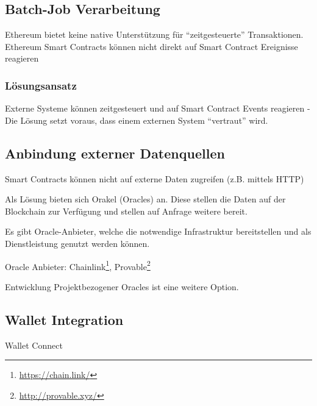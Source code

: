 \subsection*{Batch-Job Verarbeitung}
Ethereum bietet keine native Unterstützung für “zeitgesteuerte” Transaktionen.
Ethereum Smart Contracts können nicht direkt auf Smart Contract Ereignisse reagieren

\subsubsection*{Lösungsansatz}
Externe Systeme können zeitgesteuert und auf Smart Contract Events reagieren - Die Lösung setzt voraus, dass einem externen System “vertraut” wird.


\subsection*{Anbindung externer Datenquellen}
Smart Contracts können nicht auf externe Daten zugreifen (z.B. mittels HTTP)

Als Lösung bieten sich Orakel (Oracles) an. Diese stellen die Daten auf der Blockchain zur Verfügung und stellen auf Anfrage weitere bereit.

Es gibt Oracle-Anbieter, welche die notwendige Infrastruktur bereitstellen und als Dienstleistung genutzt werden können.

Oracle Anbieter: Chainlink\footnote{\url{https://chain.link/}}, Provable\footnote{\url{http://provable.xyz/}}

Entwicklung Projektbezogener Oracles ist eine weitere Option.

\subsection*{Wallet Integration}
Wallet Connect